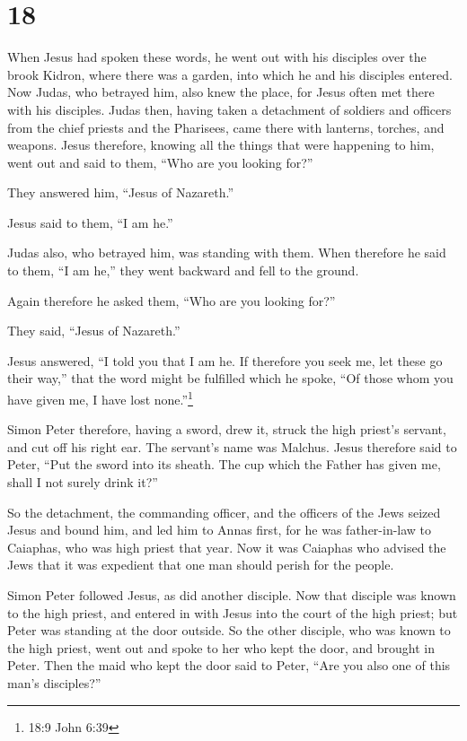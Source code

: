 \hypertarget{section-17}{%
\section{18}\label{section-17}}

 When Jesus had spoken these words, he went out with his
disciples over the brook Kidron, where there was a garden, into which he
and his disciples entered.  Now Judas, who betrayed him,
also knew the place, for Jesus often met there with his disciples.
 Judas then, having taken a detachment of soldiers and
officers from the chief priests and the Pharisees, came there with
lanterns, torches, and weapons.  Jesus therefore, knowing
all the things that were happening to him, went out and said to them,
``Who are you looking for?''

 They answered him, ``Jesus of Nazareth.''

Jesus said to them, ``I am he.''

Judas also, who betrayed him, was standing with them.  When
therefore he said to them, ``I am he,'' they went backward and fell to
the ground.

 Again therefore he asked them, ``Who are you looking for?''

They said, ``Jesus of Nazareth.''

 Jesus answered, ``I told you that I am he. If therefore you
seek me, let these go their way,''  that the word might be
fulfilled which he spoke, ``Of those whom you have given me, I have lost
none.''\footnote{18:9 John 6:39}

 Simon Peter therefore, having a sword, drew it, struck the
high priest's servant, and cut off his right ear. The servant's name was
Malchus.  Jesus therefore said to Peter, ``Put the sword
into its sheath. The cup which the Father has given me, shall I not
surely drink it?''

 So the detachment, the commanding officer, and the
officers of the Jews seized Jesus and bound him,  and led
him to Annas first, for he was father-in-law to Caiaphas, who was high
priest that year.  Now it was Caiaphas who advised the Jews
that it was expedient that one man should perish for the people.

 Simon Peter followed Jesus, as did another disciple. Now
that disciple was known to the high priest, and entered in with Jesus
into the court of the high priest;  but Peter was standing
at the door outside. So the other disciple, who was known to the high
priest, went out and spoke to her who kept the door, and brought in
Peter.  Then the maid who kept the door said to Peter,
``Are you also one of this man's disciples?''

